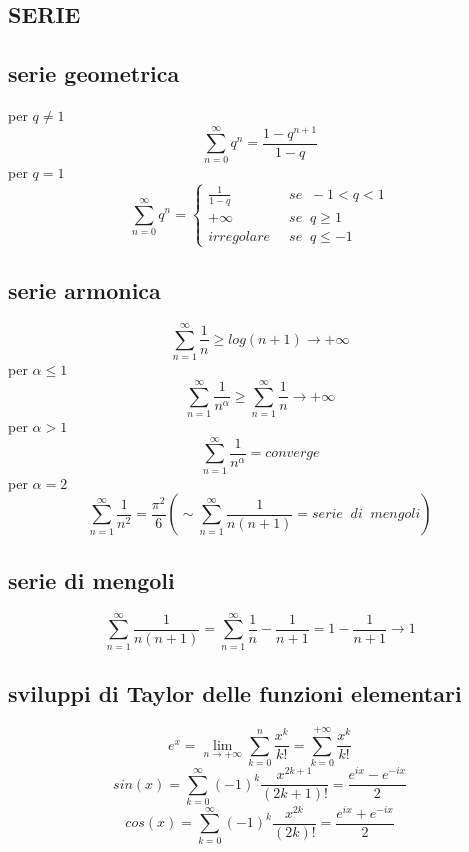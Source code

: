 \documentclass[a4paper, 9pt]{report}
\begin{document}
\subsection*{SERIE}
\subsection*{serie geometrica}
per $q \neq 1$
\[
    \sum_{n=0}^{\infty}q^n = \frac{1-q^{n+1}}{1-q}
\]
per $q = 1$
\[
    \sum_{n=0}^{\infty}q^n = \begin{cases}
        \frac{1}{1-q} & se \;\; -1<q<1\\
        +\infty &se \;\; q \geq 1\\
        irregolare \;\;& se \;\; q\leq-1 
    \end{cases}
\]
\subsection*{serie armonica}
\[
    \sum_{n=1}^{\infty}\frac{1}{n} \geq log(n+1) \rightarrow +\infty
\]
per $\alpha \leq 1$ 
\[
    \sum_{n=1}^{\infty} \frac{1}{n^\alpha} \geq \sum_{n=1}^{\infty}\frac{1}{n} \rightarrow +\infty
\]
per $\alpha > 1$ 
\[
    \sum_{n=1}^{\infty} \frac{1}{n^\alpha} = converge
\]
per $\alpha = 2$
\[
    \sum_{n=1}^{\infty}\frac{1}{n^2} = \frac{\pi^2}{6} (\sim  \sum_{n=1}^{\infty} \frac{1}{n(n+1)} = serie \;\; di \;\; mengoli)
\]
\subsection*{serie di mengoli}
\[
    \sum_{n=1}^{\infty}\frac{1}{n(n+1)} = \sum_{n=1}^{\infty} \frac{1}{n}-\frac{1}{n+1} = 1- \frac{1}{n+1} \rightarrow 1
\]
\subsection*{sviluppi di Taylor delle funzioni elementari}
\[
    e^x = \lim_{n\rightarrow +\infty}\sum_{k=0}^{n} \frac{x^k}{k!} = \sum_{k=0}^{+\infty} \frac{x^k}{k!}
\]
\[
    sin (x) =\sum_{k=0}^{\infty}(-1)^k \frac{x^{2k+1}}{(2k+1)!} =  \frac{e^{ix} - e^{-ix}}{2}
\]
\[
    cos (x) =\sum_{k=0}^{\infty}(-1)^k \frac{x^{2k}}{(2k)!} =\frac{e^{ix} + e^{-ix}}{2}
\]
\end{document}
